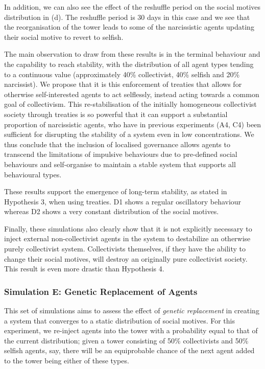 In addition, we can also see the effect of the reshuffle period on the social motives distribution in  (d). The reshuffle period is 30 days in this case and we see that the reorganisation of the tower leads to some of the narcissistic agents updating their social motive to revert to selfish.

The main observation to draw from these results is in the terminal behaviour and the capability to reach stability, with the distribution of all agent types tending to a continuous value (approximately 40\% collectivist, 40\% selfish and 20\% narcissist). We propose that it is this enforcement of treaties that allows for otherwise self-interested agents to act selflessly, instead acting towards a common goal of collectivism. This re-stabilisation of the initially homogeneous collectivist society through treaties is so powerful that it can support a substantial proportion of narcissistic agents, who have in previous experiments (A4, C4) been sufficient for disrupting the stability of a system even in low concentrations. We thus conclude that the inclusion of localised governance allows agents to transcend the limitations of impulsive behaviours due to pre-defined social behaviours and self-organise to maintain a stable system that supports all behavioural types.

These results support the emergence of long-term stability, as stated in Hypothesis 3, when using treaties. D1 shows a regular oscillatory behaviour whereas D2 shows a very constant distribution of the social motives.

Finally, these simulations also clearly show that it is not explicitly necessary to inject external non-collectivist agents in the system to destabilize an otherwise purely collectivist system. Collectivists themselves, if they have the ability to change their social motives, will destroy an originally pure collectivist society. This result is even more drastic than Hypothesis 4.


\subsubsection{Simulation E: Genetic Replacement of Agents}

This set of simulations aims to assess the effect of \textit{genetic replacement} \cite{vacher1998genetic} \cite{froese2003steps} in creating a system that converges to a static distribution of social motives. For this experiment, we re-inject agents into the tower with a probability equal to that of the current distribution; given a tower consisting of 50\% collectivists and 50\% selfish agents, say, there will be an equiprobable chance of the next agent added to the tower being either of these types.

